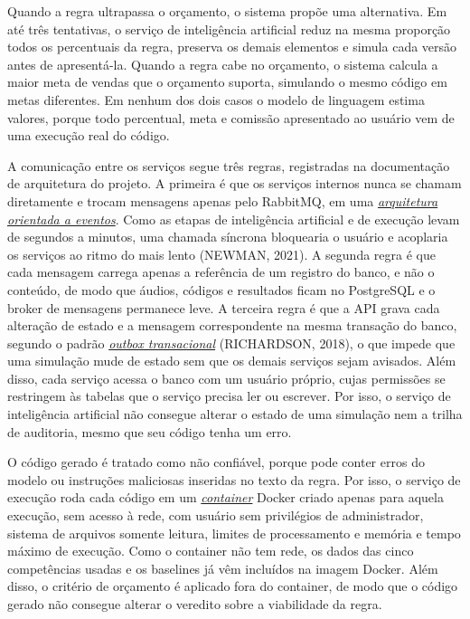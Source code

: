 \documentclass[12pt,a4paper]{article}
\newcommand{\termo}[2]{\hyperlink{gls:#1}{\textit{#2}}}
\begin{document}
Quando a regra ultrapassa o orçamento, o sistema propõe uma alternativa. Em até três tentativas, o serviço de inteligência artificial reduz na mesma proporção todos os percentuais da regra, preserva os demais elementos e simula cada versão antes de apresentá-la. Quando a regra cabe no orçamento, o sistema calcula a maior meta de vendas que o orçamento suporta, simulando o mesmo código em metas diferentes. Em nenhum dos dois casos o modelo de linguagem estima valores, porque todo percentual, meta e comissão apresentado ao usuário vem de uma execução real do código.

A comunicação entre os serviços segue três regras, registradas na documentação de arquitetura do projeto. A primeira é que os serviços internos nunca se chamam diretamente e trocam mensagens apenas pelo RabbitMQ, em uma \termo{eventos}{arquitetura orientada a eventos}. Como as etapas de inteligência artificial e de execução levam de segundos a minutos, uma chamada síncrona bloquearia o usuário e acoplaria os serviços ao ritmo do mais lento (NEWMAN, 2021). A segunda regra é que cada mensagem carrega apenas a referência de um registro do banco, e não o conteúdo, de modo que áudios, códigos e resultados ficam no PostgreSQL e o broker de mensagens permanece leve. A terceira regra é que a API grava cada alteração de estado e a mensagem correspondente na mesma transação do banco, segundo o padrão \termo{outbox}{outbox transacional} (RICHARDSON, 2018), o que impede que uma simulação mude de estado sem que os demais serviços sejam avisados. Além disso, cada serviço acessa o banco com um usuário próprio, cujas permissões se restringem às tabelas que o serviço precisa ler ou escrever. Por isso, o serviço de inteligência artificial não consegue alterar o estado de uma simulação nem a trilha de auditoria, mesmo que seu código tenha um erro.

O código gerado é tratado como não confiável, porque pode conter erros do modelo ou instruções maliciosas inseridas no texto da regra. Por isso, o serviço de execução roda cada código em um \termo{container}{container} Docker criado apenas para aquela execução, sem acesso à rede, com usuário sem privilégios de administrador, sistema de arquivos somente leitura, limites de processamento e memória e tempo máximo de execução. Como o container não tem rede, os dados das cinco competências usadas e os baselines já vêm incluídos na imagem Docker. Além disso, o critério de orçamento é aplicado fora do container, de modo que o código gerado não consegue alterar o veredito sobre a viabilidade da regra.
\end{document}
